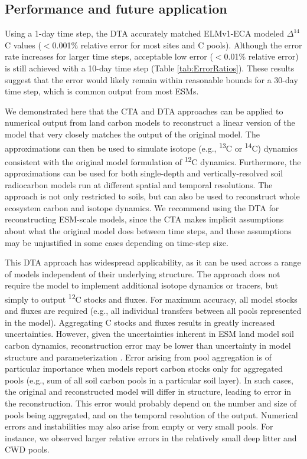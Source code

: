 \documentclass[draft]{agujournal2019}
\begin{document}
\subsection{Performance and future application}
Using a 1-day time step, the DTA accurately matched ELMv1-ECA modeled $\Delta^{14}$C values ($<$0.001\% relative error for most sites and C pools). Although the error rate increases for larger time steps, acceptable low error ($<$0.01\% relative error) is still achieved with a 10-day time step (Table \ref{tab:ErrorRatios}). These results suggest that the error would likely remain within reasonable bounds for a 30-day time step, which is common output from most ESMs.

We demonstrated here that the CTA and DTA  approaches can be applied to numerical output from land carbon models to reconstruct a linear version of the model that very closely matches the output of the original model. The approximations can then be used to simulate isotope (e.g., \textsuperscript{13}C or \textsuperscript{14}C) dynamics consistent with the original model formulation of \textsuperscript{12}C dynamics. Furthermore, the approximations can be used for both single-depth and vertically-resolved soil radiocarbon models run at different spatial and temporal resolutions. The approach is not only restricted to soils, but can also be used to reconstruct whole ecosystem carbon and isotope dynamics.  We recommend using the DTA for reconstructing ESM-scale models, since the CTA makes implicit assumptions about what the original model does between time steps, and these assumptions may  be unjustified in some cases depending on time-step size.

This DTA approach has widespread applicability, as it can be used across a range of models independent of their underlying structure. The approach does not require the model to implement additional isotope dynamics or tracers, but simply to output \textsuperscript{12}C stocks and fluxes. For maximum accuracy, all model stocks and fluxes are required (e.g., all individual transfers between all pools represented in the model). Aggregating C stocks and fluxes results in greatly increased uncertainties. However, given the uncertainties inherent in ESM land model soil carbon dynamics, reconstruction error may be lower than uncertainty in model structure and parameterization \cite{Chen2009JGR}. Error arising from pool aggregation is of particular importance when models report carbon stocks only for aggregated pools (e.g., sum of all soil carbon pools in a particular soil layer). In such cases, the original and reconstructed model will differ in structure, leading to error in the reconstruction. This error would probably depend on the number and size of pools being aggregated, and on the temporal resolution of the output. Numerical errors and instabilities may also arise from empty or very small pools. For instance, we observed larger relative errors in the relatively small deep litter and CWD pools.
\end{document}
